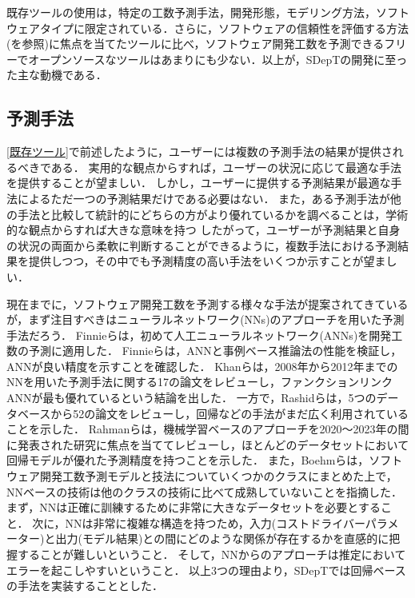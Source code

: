 既存ツールの使用は，特定の工数予測手法，開発形態，モデリング方法，ソフトウェアタイプに限定されている．さらに，ソフトウェアの信頼性を評価する方法(\cite{Xiao2024}を参照)に焦点を当てたツールに比べ，ソフトウェア開発工数を予測できるフリーでオープンソースなツールはあまりにも少ない．以上が，SDepTの開発に至った主な動機である．


\subsection{予測手法}\label{予測手法}
\ref{既存ツール}で前述したように，ユーザーには複数の予測手法の結果が提供されるべきである．
実用的な観点からすれば，ユーザーの状況に応じて最適な手法を提供することが望ましい．
しかし，ユーザーに提供する予測結果が最適な手法によるただ一つの予測結果だけである必要はない．
また，ある予測手法が他の手法と比較して統計的にどちらの方がより優れているかを調べることは，学術的な観点からすれば大きな意味を持つ
したがって，ユーザーが予測結果と自身の状況の両面から柔軟に判断することができるように，複数手法における予測結果を提供しつつ，その中でも予測精度の高い手法をいくつか示すことが望ましい．

現在までに，ソフトウェア開発工数を予測する様々な手法が提案されてきているが，まず注目すべきはニューラルネットワーク(NNs)のアプローチを用いた予測手法だろう．
Finnieら\cite{Finnie1996}は，初めて人工ニューラルネットワーク(ANNs)を開発工数の予測に適用した．
Finnieら\cite{Finnie1996}は，ANNと事例ベース推論法の性能を検証し，ANNが良い精度を示すことを確認した．
Khanら\cite{Khan2014}は，2008年から2012年までのNNを用いた予測手法に関する17の論文をレビューし，ファンクションリンクANNが最も優れているという結論を出した．
一方で，Rashidら\cite{Rashid2023}は，5つのデータベースから52の論文をレビューし，回帰などの手法がまだ広く利用されていることを示した．
Rahman\cite{Rahman2024}らは，機械学習ベースのアプローチを2020～2023年の間に発表された研究に焦点を当ててレビューし，ほとんどのデータセットにおいて回帰モデルが優れた予測精度を持つことを示した．
また，Boehmら\cite{Boehm2000}は，ソフトウェア開発工数予測モデルと技法についていくつかのクラスにまとめた上で，NNベースの技術は他のクラスの技術に比べて成熟していないことを指摘した．
まず，NNは正確に訓練するために非常に大きなデータセットを必要とすること．
次に，NNは非常に複雑な構造を持つため，入力(コストドライバーパラメーター)と出力(モデル結果)との間にどのような関係が存在するかを直感的に把握することが難しいということ．
そして，NNからのアプローチは推定においてエラーを起こしやすいということ．
以上3つの理由より，SDepTでは回帰ベースの手法を実装することとした．

